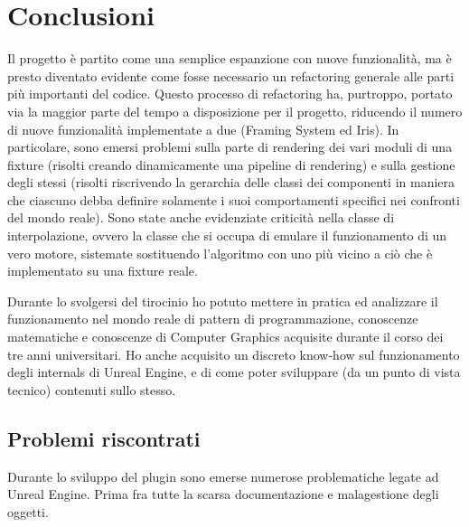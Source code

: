 \documentclass[main.tex]{subfiles}
\begin{document}
\sloppy


\vspace{1.0cm}

\section{Conclusioni}\label{sec:End}
Il progetto è partito come una semplice espanzione con nuove funzionalità, ma è presto diventato evidente come fosse necessario un refactoring generale alle parti più importanti del codice. Questo processo di refactoring ha, purtroppo, portato via la maggior parte del tempo a disposizione per il progetto, riducendo il numero di nuove funzionalità implementate a due (Framing System ed Iris). In particolare, sono emersi problemi sulla parte di rendering dei vari moduli di una fixture (risolti creando dinamicamente una pipeline di rendering) e sulla gestione degli stessi (risolti riscrivendo la gerarchia delle classi dei componenti in maniera che ciascuno debba definire solamente i suoi comportamenti specifici nei confronti del mondo reale). Sono state anche evidenziate criticità nella classe di interpolazione, ovvero la classe che si occupa di emulare il funzionamento di un vero motore, sistemate sostituendo l'algoritmo con uno più vicino a ciò che è implementato su una fixture reale.

Durante lo svolgersi del tirocinio ho potuto mettere in pratica ed analizzare il funzionamento nel mondo reale di pattern di programmazione, conoscenze matematiche e conoscenze di Computer Graphics acquisite durante il corso dei tre anni universitari. Ho anche acquisito un discreto know-how sul funzionamento degli internals di Unreal Engine, e di come poter sviluppare (da un punto di vista tecnico) contenuti sullo stesso. 

\subsection{Problemi riscontrati}\label{subsec:6_Problems}
Durante lo sviluppo del plugin sono emerse numerose problematiche legate ad Unreal Engine. Prima fra tutte la scarsa documentazione e malagestione degli oggetti.\newline
\end{document}
